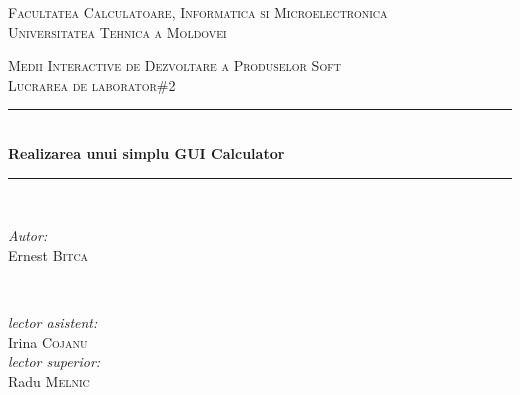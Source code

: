 \begin{titlepage}

\begin{center} %

\textsc{\large Facultatea Calculatoare, Informatica si Microelectronica}\\[0.5cm]
\textsc{\large Universitatea Tehnica a Moldovei}\\[1.2cm] %
\vspace{25 mm}

\textsc{\Large Medii Interactive de Dezvoltare a Produselor Soft}\\[0.5cm] %
\textsc{\large Lucrarea de laborator\#2}\\[0.5cm] %

\newcommand{\HRule}{\rule{\linewidth}{0.5mm}} %

\vspace{10 mm}
\HRule \\[0.4cm]
{ \LARGE \bfseries Realizarea unui simplu GUI Calculator  }\\[0.4cm] %
\HRule \\[1.5cm]

\vspace{30mm}

\begin{minipage}{0.4\textwidth}
\begin{flushleft} \large
\emph{Autor:}\\
		Ernest \textsc{Bitca}
		\end{flushleft}
		\end{minipage}
		~
		\begin{minipage}{0.4\textwidth}
		\begin{flushright} \large
		\emph{lector asistent:} \\
			Irina \textsc{Cojanu} \\ %
			\emph{lector superior:} \\
				Radu \textsc{Melnic} %
				\end{flushright}
				\end{minipage}\\[4cm]


\end{center}
\end{titlepage}
